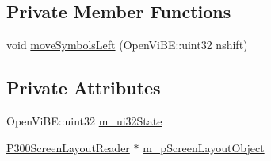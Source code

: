 \subsection*{Private Member Functions}
\begin{DoxyCompactItemize}
\item 
void \hyperlink{classOpenViBEApplications_1_1P300TargetAreaHandler_a2920f428423d1a05e6c87c991ff4f13a}{moveSymbolsLeft} (OpenViBE::uint32 nshift)
\end{DoxyCompactItemize}
\subsection*{Private Attributes}
\begin{DoxyCompactItemize}
\item 
OpenViBE::uint32 \hyperlink{classOpenViBEApplications_1_1P300TargetAreaHandler_a465f0f158652b367f956166847965e76}{m\_\-ui32State}
\item 
\hyperlink{classOpenViBEApplications_1_1P300ScreenLayoutReader}{P300ScreenLayoutReader} $\ast$ \hyperlink{classOpenViBEApplications_1_1P300TargetAreaHandler_a16cdcd20c52f9737efd952f0f0dad3fa}{m\_\-pScreenLayoutObject}
\end{DoxyCompactItemize}


